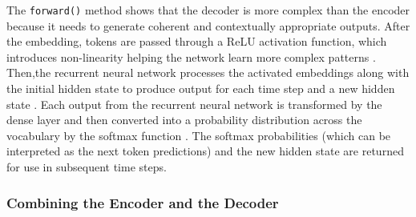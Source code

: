 The \lstinline{forward()} method shows that the decoder is more complex than the encoder because it needs to generate coherent and contextually appropriate outputs.
After the embedding, tokens are passed through a ReLU activation function, which introduces non-linearity helping the network learn more complex patterns . Then,the recurrent neural network processes the activated embeddings along with the initial hidden state to produce output for each time step and a new hidden state . Each output from the recurrent neural network is transformed by the dense layer  and then converted into a probability distribution across the vocabulary by the softmax function . The softmax probabilities (which can be interpreted as the next token predictions) and the new hidden state are returned for use in subsequent time steps.

\subsubsection{Combining the Encoder and the Decoder}

